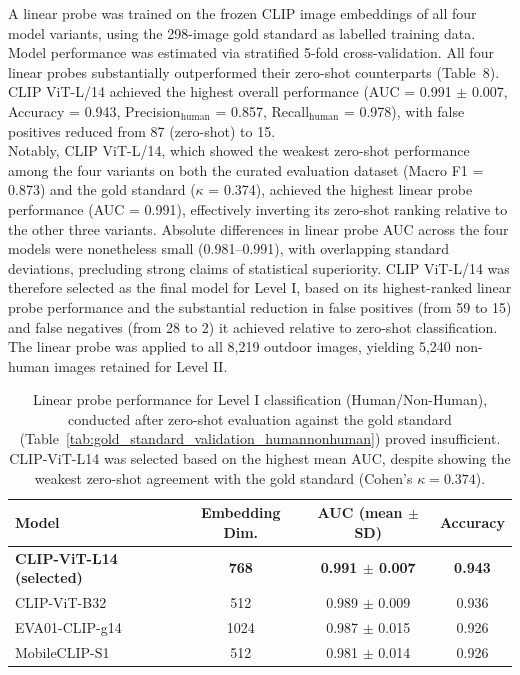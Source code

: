 \documentclass[hidelinks, 11pt]{article}
\begin{document}
A linear probe was trained on the frozen CLIP image embeddings of all four model variants, using the 298-image gold standard as labelled training data. Model performance was estimated via stratified 5-fold cross-validation. All four linear probes substantially outperformed their zero-shot counterparts (Table~8). CLIP ViT-L/14 achieved the highest overall performance (AUC = 0.991 $\pm$ 0.007, Accuracy = 0.943, Precision$_{\mathrm{human}}$ = 0.857, Recall$_{\mathrm{human}}$ = 0.978), with false positives reduced from 87 (zero-shot) to 15.
\\
Notably, CLIP ViT-L/14, which showed the weakest zero-shot performance among the four variants on both the curated evaluation dataset (Macro F1 = 0.873) and the gold standard ($\kappa$ = 0.374), achieved the highest
linear probe performance (AUC = 0.991), effectively inverting its zero-shot ranking relative to the other three variants. Absolute differences in linear probe AUC across the four models were nonetheless small (0.981--0.991), with overlapping standard deviations, precluding strong claims of statistical superiority. CLIP ViT-L/14 was therefore selected as the final model for Level I, based on its highest-ranked linear probe performance and the substantial reduction in false positives (from 59 to 15) and false negatives (from 28 to 2) it achieved relative to zero-shot classification. The linear probe was applied to all 8,219 outdoor images, yielding 5,240 non-human images retained for Level II.

\begin{table}[htbp]
\centering
\caption{Linear probe performance for Level I classification (Human/Non-Human), conducted after zero-shot evaluation against the gold standard (Table~\ref{tab:gold_standard_validation_humannonhuman}) proved insufficient. CLIP-ViT-L14 was selected based on the highest mean AUC, despite showing the weakest zero-shot agreement with the gold standard (Cohen's $\kappa = 0.374$).}
\label{tab:linearprobe_humannonhuman}
\begin{tabular}{@{}lccc@{}}
\toprule
\textbf{Model} & \textbf{Embedding Dim.} & \textbf{AUC (mean $\pm$ SD)} & \textbf{Accuracy} \\
\midrule
\textbf{CLIP-ViT-L14 (selected)} & \textbf{768}  & \textbf{0.991 $\pm$ 0.007} & \textbf{0.943} \\
CLIP-ViT-B32              & 512  & 0.989 $\pm$ 0.009 & 0.936 \\
EVA01-CLIP-g14            & 1024 & 0.987 $\pm$ 0.015 & 0.926 \\
MobileCLIP-S1             & 512  & 0.981 $\pm$ 0.014 & 0.926 \\
\bottomrule
\end{tabular}
\end{table}
\end{document}
